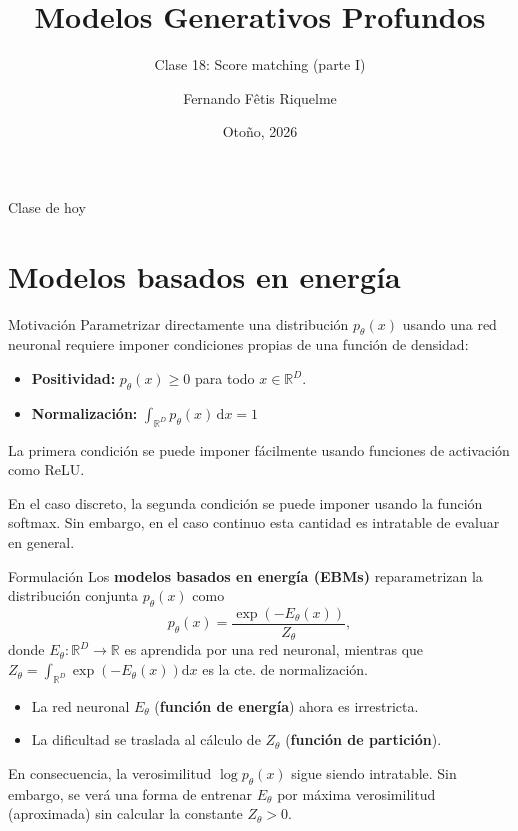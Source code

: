 \documentclass{beamer}
\title{Modelos Generativos Profundos}
\subtitle{Clase 18: Score matching (parte I)}
\author{Fernando Fêtis Riquelme}
\institute{
    Facultad de Ciencias Físicas y Matemáticas\\
    Universidad de Chile
}
\date{Otoño, 2026}
\newcommand{\R}{\mathbb{R}}
\begin{document}
\begin{frame}
    \titlepage
\end{frame}

\begin{frame}{Clase de hoy}
    \tableofcontents
\end{frame}

\section{Modelos basados en energía}

\begin{frame}{Motivación}
    Parametrizar directamente una distribución $p_\theta(x)$ usando una red neuronal requiere imponer condiciones propias de una función de densidad:
    \begin{itemize}
        \item \textbf{Positividad:} $p_\theta(x)\geq 0$ para todo $x\in\R^D$.
        \item \textbf{Normalización:} $\int_{\R^D}p_\theta(x)\,\text{d}x=1$
    \end{itemize}
    La primera condición se puede imponer fácilmente usando funciones de activación como ReLU.

    En el caso discreto, la segunda condición se puede imponer usando la función softmax. Sin embargo, en el caso continuo esta cantidad es intratable de evaluar en general.
\end{frame}

\begin{frame}{Formulación}
    Los \textbf{modelos basados en energía (EBMs)} reparametrizan la distribución conjunta $p_\theta(x)$ como
    \begin{equation*}
        p_\theta(x)=\frac{\exp\left(-E_\theta(x)\right)}{Z_\theta},
    \end{equation*}
    donde $E_\theta:\R^D\to\R$  es aprendida por una red neuronal, mientras que $Z_\theta=\int_{\R^D} \exp\left(-E_\theta(x)\right)\text{d}x$ es la cte. de normalización.
    \begin{itemize}
        \item La red neuronal $E_\theta$ (\textbf{función de energía}) ahora es irrestricta.
        \item La dificultad se traslada al cálculo de $Z_\theta$ (\textbf{función de partición}).
    \end{itemize}
    En consecuencia, la verosimilitud $\log p_\theta(x)$ sigue siendo intratable. Sin embargo, se verá una forma de entrenar $E_\theta$ por máxima verosimilitud (aproximada) sin calcular la constante $Z_\theta>0$.
\end{frame}
\end{document}
